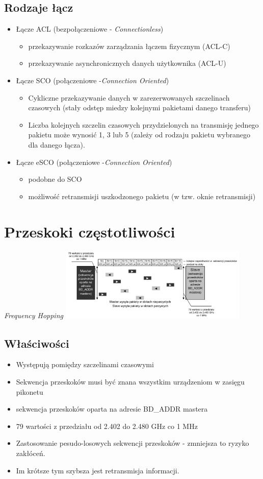 \subsection{Rodzaje łącz}
\begin{itemize}
	\item Łącze ACL (bezpołączeniowe - \emph{Connectionless})
	\begin{itemize}
		\item przekazywanie rozkazów zarządzania łączem fizycznym (ACL-C)
		\item przekazywanie asynchronicznych danych użytkownika (ACL-U)
	\end{itemize}
	\item Łącze SCO (połączeniowe -\emph{Connection Oriented})
	\begin{itemize}
		\item Cykliczne przekazywanie danych w zarezerwowanych szczelinach czasowych (stały odstęp miedzy kolejnymi pakietami danego transferu)
		\item Liczba kolejnych szczelin czasowych przydzielonych na transmisję jednego pakietu może wynosić 1, 3 lub 5 (zależy od rodzaju pakietu wybranego dla danego łącza).
	\end{itemize}
	\item Łącze eSCO (połączeniowe -\emph{Connection Oriented})
	\begin{itemize}
			\item podobne do SCO
			\item możliwość retransmisji uszkodzonego pakietu (w tzw. oknie retransmisji)
	\end{itemize}
\end{itemize}

\section{Przeskoki częstotliwości}
\emph{Frequency Hopping}
\includegraphics[width=9cm]{./wyklady/Rysunek04.pdf}
\subsection{Właściwości}
\begin{itemize}
	\item Występują pomiędzy szczelinami czasowymi
	\item Sekwencja przeskoków musi być znana wszystkim urządzeniom w zasięgu pikonetu
	\item sekwencja przeskoków oparta na adresie BD\_ADDR mastera
	\item 79 wartości z przedziału od 2.402 do 2.480 GHz co 1 MHz
	\item Zastosowanie pesudo-losowych sekwencji przeskoków - zmniejsza to ryzyko zakłóceń.
	\item Im krótsze tym szybsza jest retransmisja informacji.
\end{itemize}
